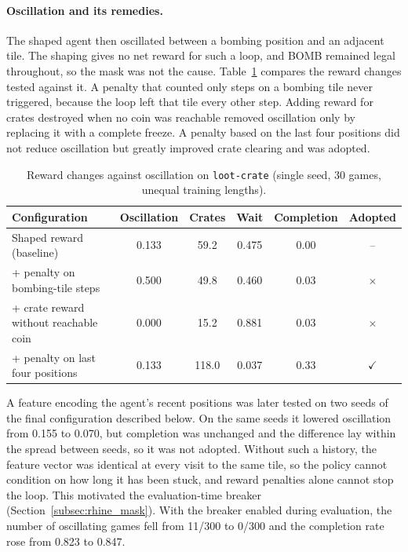 \documentclass[11pt,a4paper]{report}
\begin{document}
	\paragraph{Oscillation and its remedies.} The shaped agent then oscillated between a bombing position and an adjacent tile. The shaping gives no net reward for such a loop, and BOMB remained legal throughout, so the mask was not the cause. Table~\ref{tab:rhine_task2_ablation} compares the reward changes tested against it. A penalty that counted only steps on a bombing tile never triggered, because the loop left that tile every other step. Adding reward for crates destroyed when no coin was reachable removed oscillation only by replacing it with a complete freeze. A penalty based on the last four positions did not reduce oscillation but greatly improved crate clearing and was adopted. 
	
	\begin{table}[htbp]
		\centering
		\small
		\begin{tabular}{lccccc}
			\toprule
			Configuration & Oscillation & Crates & Wait & Completion & Adopted \\
			\midrule
			Shaped reward (baseline) & 0.133 & 59.2 & 0.475 & 0.00 & -- \\
			+ penalty on bombing-tile steps & 0.500 & 49.8 & 0.460 & 0.03 & $\times$ \\
			+ crate reward without reachable coin & 0.000 & 15.2 & 0.881 & 0.03 & $\times$ \\
			+ penalty on last four positions & 0.133 & 118.0 & 0.037 & 0.33 & $\checkmark$ \\
			\bottomrule
		\end{tabular}
		\caption{Reward changes against oscillation on \texttt{loot-crate} (single seed, 30 games, unequal training lengths).}
		\label{tab:rhine_task2_ablation}
	\end{table}
	A feature encoding the agent's recent positions was later tested on two seeds of the final configuration described below. On the same seeds it lowered oscillation from 0.155 to 0.070, but completion was unchanged and the difference lay within the spread between seeds, so it was not adopted. Without such a history, the feature vector was identical at every visit to the same tile, so the policy cannot condition on how long it has been stuck, and reward penalties alone cannot stop the loop. This motivated the evaluation-time breaker (Section~\ref{subsec:rhine_mask}). With the breaker enabled during evaluation, the number of oscillating games fell from 11/300 to 0/300 and the completion rate rose from 0.823 to 0.847.
	
\end{document}
